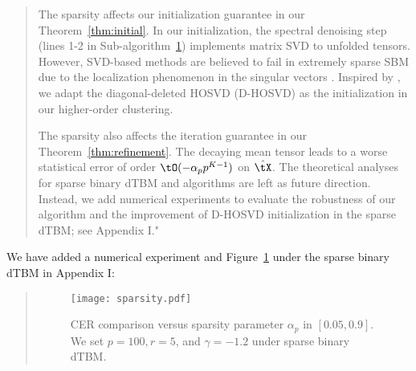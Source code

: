 \documentclass[11pt]{article}
\theoremstyle{definition}
\theoremstyle{definition}
\begin{document}
\begin{enumerate}[wide, labelwidth=!, labelindent=0pt]
\begin{quote}

The sparsity affects our initialization guarantee in our Theorem~\ref{thm:initial}. In our initialization, the spectral denoising step (lines 1-2 in Sub-algorithm~\hyperref[alg:main]{1}) implements matrix SVD to unfolded tensors. %
However, SVD-based methods are believed to fail in extremely sparse SBM due to the localization phenomenon in the singular vectors \citep{florescu2016spectral}. Inspired by \cite{florescu2016spectral}, we adapt the diagonal-deleted HOSVD (D-HOSVD) \citep{ke2019community} as the initialization in our higher-order clustering. 

The sparsity also affects the iteration guarantee in our Theorem~\ref{thm:refinement}. The decaying mean tensor leads to a worse statistical error of order $\tO( -\alpha_p p^{K-1})$ on $\hat \tX$. The theoretical analyses for sparse binary dTBM and algorithms are left as future direction. Instead, we add numerical experiments to evaluate the robustness of our algorithm and the improvement of D-HOSVD initialization in the sparse dTBM; see Appendix I."
\end{quote}

We have added a numerical experiment and Figure~\ref{fig:sparse} under the sparse binary dTBM in Appendix I: 

\begin{quote}

\begin{figure}[h!]
    \centering
    \texttt{[image: sparsity.pdf]}
    \caption{CER comparison versus sparsity parameter $\alpha_p$ in $[0.05, 0.9]$. We set $p = 100, r = 5$, and $\gamma = -1.2$ under sparse binary dTBM.}
    \label{fig:sparse}
\end{figure}


\end{quote}
\end{enumerate}
\end{document}
